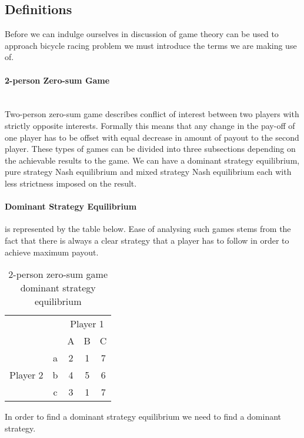 \documentclass[10pt, a4paper]{report}
\begin{document}
\subsection{Definitions}\label{subsec:defs}

Before we can indulge ourselves in discussion of game theory can be used to approach bicycle racing problem we must introduce the terms we are making use of.

\paragraph{2-person Zero-sum Game} ~\\
Two-person zero-sum game describes conflict of interest between two players with strictly opposite interests. Formally this means that any change in the pay-off of one player has to be offset with equal decrease in amount of payout to the second player. These types of games can be divided into three subsections depending on the achievable results to the game. We can have a dominant strategy equilibrium, pure strategy Nash equilibrium and mixed strategy Nash equilibrium each with less strictness imposed on the result.
\paragraph{Dominant Strategy Equilibrium}
is represented by the table below. Ease of analysing such games stems from the fact that there is always a clear strategy that a player has to follow in order to achieve maximum payout.\\


\begin{table}[ht!]
	\hspace{-4em}
	\centering
	\begin{tabular}{ccccc|}
		& & \multicolumn{3}{c}{Player 1}                                \\ \cline{3-5}
		& & A & B & \multicolumn{1}{c}{C}                               \\ \cline{3-5}
		\multirow{3}{*}{Player 2} & \multicolumn{1}{|c|}{a} & 2 & 1 & 7 \\
		& \multicolumn{1}{|c|}{b} & 4 & 5 & 6                           \\
		& \multicolumn{1}{|c|}{c} & 3 & 1 & 7                           \\ \cline{3-5}
	\end{tabular}
	\caption{2-person zero-sum game\\ dominant strategy equilibrium}
\end{table}
\noindent In order to find a dominant strategy equilibrium we need to find a dominant strategy.
\end{document}
